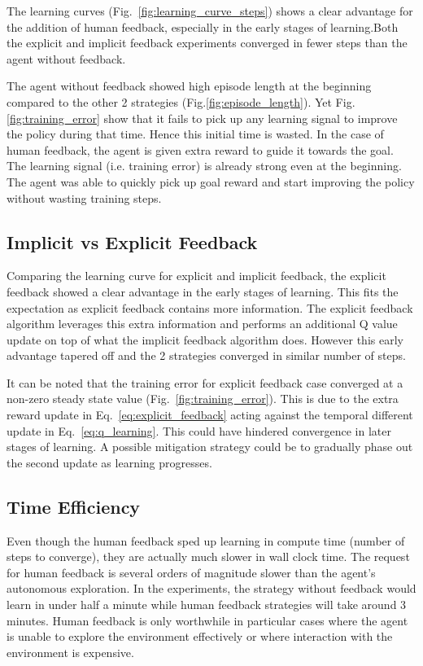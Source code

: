 \documentclass[conference]{IEEEtran}
\begin{document}
The learning curves (Fig.~\ref{fig:learning_curve_steps}) shows a clear advantage for the addition of human feedback, especially in the early stages of learning.Both the explicit and implicit feedback experiments converged in fewer steps than the agent without feedback.

The agent without feedback showed high episode length at the beginning compared to the other 2 strategies (Fig.\ref{fig:episode_length}). Yet Fig.\ref{fig:training_error} show that it fails to pick up any learning signal to improve the policy during that time. Hence this initial time is wasted. In the case of human feedback, the agent is given extra reward to guide it towards the goal. The learning signal (i.e. training error) is already strong even at the beginning. The agent was able to quickly pick up goal reward and start improving the policy without wasting training steps.

\subsection{Implicit vs Explicit Feedback}

Comparing the learning curve for explicit and implicit feedback, the explicit feedback showed a clear advantage in the early stages of learning. This fits the expectation as explicit feedback contains more information. The explicit feedback algorithm leverages this extra information and performs an additional Q value update on top of what the implicit feedback algorithm does.
However this early advantage tapered off and the 2 strategies converged in similar number of steps.

It can be noted that the training error for explicit feedback case converged at a non-zero steady state value (Fig.~\ref{fig:training_error}). This is due to the extra reward update in Eq.~\ref{eq:explicit_feedback} acting against the temporal different update in Eq.~\ref{eq:q_learning}. This could have hindered convergence in later stages of learning. A possible mitigation strategy could be to gradually phase out the second update as learning progresses.

\subsection{Time Efficiency}

Even though the human feedback sped up learning in compute time (number of steps to converge), they are actually much slower in wall clock time. The request for human feedback is several orders of magnitude slower than the agent's autonomous exploration. In the experiments, the strategy without feedback would learn in under half a minute while human feedback strategies will take around 3 minutes. Human feedback is only worthwhile in particular cases where the agent is unable to explore the environment effectively or where interaction with the environment is expensive.
\end{document}
